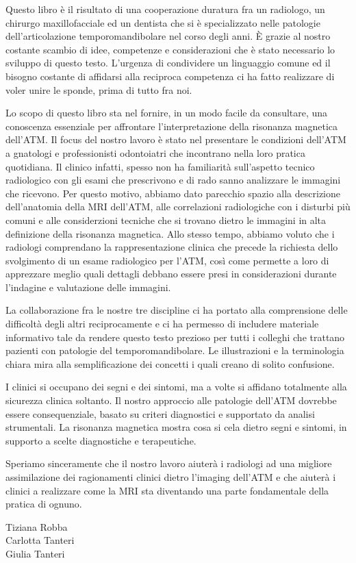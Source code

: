 \documentclass[10pt,twocolumn,a4paper]{article}
\begin{document}
	\vspace*{0.5cm}
	Questo libro è il risultato di una cooperazione duratura fra un radiologo, un chirurgo maxillofacciale ed un dentista che si è specializzato nelle patologie dell'articolazione temporomandibolare nel corso degli anni. È grazie al nostro costante scambio
	di idee, competenze e considerazioni che è stato necessario lo sviluppo di questo testo. L'urgenza di condividere un linguaggio comune ed il bisogno costante di affidarsi alla reciproca competenza ci ha fatto realizzare di voler unire le sponde, 
	prima di tutto fra noi. \par Lo scopo di questo libro sta nel fornire, in un modo facile da consultare, una conoscenza essenziale per affrontare l'interpretazione della risonanza magnetica dell'ATM. Il focus del nostro lavoro è stato nel presentare
	le condizioni dell'ATM a gnatologi e professionisti odontoiatri che incontrano nella loro pratica quotidiana. Il clinico infatti, spesso non ha familiarità sull'aspetto tecnico radiologico con gli esami che prescrivono e di rado sanno analizzare le 
	immagini che ricevono. Per questo motivo, abbiamo dato parecchio spazio alla descrizione dell'anatomia della MRI dell'ATM, alle correlazioni radiologiche con i disturbi più comuni e alle considerzioni tecniche che si trovano dietro le immagini in 
	alta definizione della risonanza magnetica. Allo stesso tempo, abbiamo voluto che i radiologi comprendano la rappresentazione clinica che precede la richiesta dello svolgimento di un esame radiologico per l'ATM, così come permette a loro di
	apprezzare meglio quali dettagli debbano essere presi in considerazioni durante l'indagine e valutazione delle immagini. \par La collaborazione fra le nostre tre discipline ci ha portato alla comprensione delle difficoltà degli altri reciprocamente 
	e ci ha permesso di includere materiale informativo tale da rendere questo testo prezioso per tutti i colleghi che trattano pazienti con patologie del temporomandibolare. Le illustrazioni e la terminologia chiara mira alla semplificazione dei 
	concetti i quali creano di solito confusione. \par I clinici si occupano dei segni e dei sintomi, ma a volte si affidano totalmente alla sicurezza clinica soltanto. Il nostro approccio alle patologie dell'ATM dovrebbe essere consequenziale, basato 
	su criteri diagnostici e supportato da analisi strumentali. La risonanza magnetica mostra cosa si cela dietro segni e sintomi, in supporto a scelte diagnostiche e terapeutiche. \par Speriamo sinceramente che il nostro lavoro aiuterà i radiologi
	ad una migliore assimilazione dei ragionamenti clinici dietro l'imaging dell'ATM e che aiuterà i clinici a realizzare come la MRI sta diventando una parte fondamentale della pratica di ognuno.
	\begin{flushright}
		Tiziana Robba\\ Carlotta Tanteri \\ Giulia Tanteri
	\end{flushright}
	
	
\end{document}
